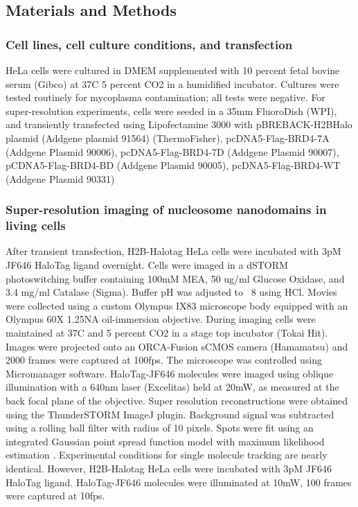 \subsection{Materials and Methods}

\subsubsection{Cell lines, cell culture conditions, and transfection}

HeLa cells were cultured in DMEM supplemented with 10 percent fetal bovine serum (Gibco) at 37C 5 percent CO2 in a humidified incubator. Cultures were tested routinely for mycoplasma contamination; all tests were negative. For super-resolution experiments, cells were seeded in a 35mm FluoroDish (WPI), and transiently transfected using Lipofectamine 3000 with pBREBACK-H2BHalo plasmid (Addgene plasmid 91564) (ThermoFisher), pcDNA5-Flag-BRD4-7A (Addgene Plasmid 90006), pcDNA5-Flag-BRD4-7D (Addgene Plasmid 90007), pCDNA5-Flag-BRD4-BD (Addgene Plasmid 90005), pcDNA5-Flag-BRD4-WT (Addgene Plasmid 90331)

\subsubsection{Super-resolution imaging of nucleosome nanodomains in living cells}

After transient transfection, H2B-Halotag HeLa cells were incubated with 3pM JF646 HaloTag ligand overnight. Cells were imaged in a dSTORM photoswitching buffer containing 100mM MEA, 50 ug/ml Glucose Oxidase, and 3.4 mg/ml Catalase (Sigma). Buffer pH was adjusted to ~8 using HCl. Movies were collected using a custom Olympus IX83 microscope body equipped with an Olympus 60X 1.25NA oil-immersion objective. During imaging cells were maintained at 37C and 5 percent CO2 in a stage top incubator (Tokai Hit). Images were projected onto an ORCA-Fusion sCMOS camera (Hamamatsu) and 2000 frames were captured at 100fps. The microscope was controlled using Micromanager software. HaloTag-JF646 molecules were imaged using oblique illumination with a 640nm laser (Excelitas) held at 20mW, as measured at the back focal plane of the objective. Super resolution reconstructions were obtained using the ThunderSTORM ImageJ plugin. Background signal was subtracted using a rolling ball filter with radius of 10 pixels. Spots were fit using an integrated Gaussian point spread function model with maximum likelihood estimation \parencite{Smith2010,Huang2013}. Experimental conditions for single molecule tracking are nearly identical. However, H2B-Halotag HeLa cells were incubated with 3pM JF646 HaloTag ligand. HaloTag-JF646 molecules were illuminated at 10mW, 100 frames were captured at 10fps. 


